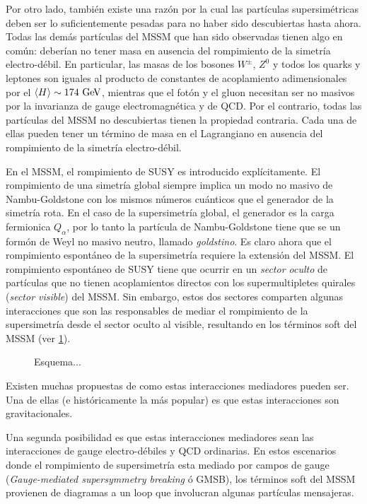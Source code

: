 Por otro lado, también existe una razón por la cual las partículas
supersimétricas deben ser lo suficientemente pesadas para no haber
sido descubiertas hasta ahora. Todas las demás partículas del MSSM que
han sido observadas tienen algo en común: deberían no tener masa en
ausencia del rompimiento de la simetría electro-débil. En particular,
las masas de los bosones $W^\pm$, $Z^0$ y todos los quarks y leptones
son iguales al producto de constantes de acoplamiento adimensionales
por el $\avg{H} \sim 174 \gev$, mientras que el fotón y el gluon
necesitan ser no masivos por la invarianza de gauge electromagnética y
de QCD. Por el contrario, todas las partículas del MSSM no
descubiertas tienen la propiedad contraria. Cada una de ellas pueden
tener un término de masa en el Lagrangiano en ausencia del rompimiento
de la simetría electro-débil.

En el MSSM, el rompimiento de SUSY es introducido explícitamente. El
rompimiento de una simetría global siempre implica un modo no masivo
de Nambu-Goldstone con los mismos números cuánticos que el generador
de la simetría rota. En el caso de la supersimetría global, el
generador es la carga fermionica $Q_\alpha$, por lo tanto la partícula
de Nambu-Goldstone tiene que se un formón de Weyl no masivo neutro,
llamado \emph{goldstino}. Es claro ahora que el rompimiento espontáneo
de la supersimetría requiere la extensión del MSSM. El rompimiento
espontáneo de SUSY tiene que ocurrir en un \emph{sector oculto} de
partículas que no tienen acoplamientos directos con los
supermultipletes quirales (\emph{sector visible}) del MSSM. Sin
embargo, estos dos sectores comparten algunas interacciones que son
las responsables de mediar el rompimiento de la supersimetría desde el
sector oculto al visible, resultando en los términos soft del MSSM
(ver \cref{fig:susy_breaking}).

\begin{figure}[!htbp]
  \centering 
  \caption{Esquema...}\label{fig:susy_breaking}
\end{figure}

Existen muchas propuestas de como estas interacciones mediadores
pueden ser. Una de ellas (e históricamente la más popular) es que
estas interacciones son gravitacionales.

Una segunda posibilidad es que estas interacciones mediadores sean las
interacciones de gauge electro-débiles y QCD ordinarias. En estos
escenarios donde el rompimiento de supersimetría esta mediado por
campos de gauge (\emph{Gauge-mediated supersymmetry breaking} ó GMSB),
los términos soft del MSSM provienen de diagramas a un loop que
involucran algunas partículas mensajeras.

